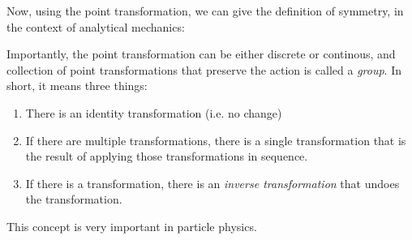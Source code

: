 Now, using the point transformation, we can give the definition of symmetry, in the context of analytical mechanics:

Importantly, the point transformation can be either discrete or continous, and collection of point transformations that preserve the action is called a \emph{group}.
In short, it means three things:
\begin{enumerate}
  \item There is an identity transformation (i.e. no change)
  \item If there are multiple transformations, there is a single transformation that is the result of applying those transformations in sequence.
  \item If there is a transformation, there is an \emph{inverse transformation} that undoes the transformation.
\end{enumerate}

This concept is very important in particle physics.

